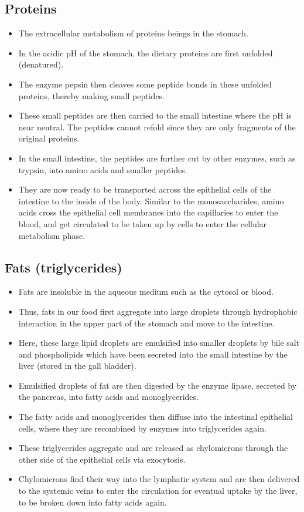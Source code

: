 \documentclass[11pt]{article}
\begin{document}
\subsection{Proteins}
\label{sec:org143371c}
\begin{itemize}
\item The extracellular metabolism of proteins beings in the stomach.
\item In the acidic pH of the stomach, the dietary proteins are first unfolded (denatured).
\item The enzyme pepsin then cleaves some peptide bonds in these unfolded proteins, thereby making small peptides.
\item These small peptides are then carried to the small intestine where the pH is near neutral. The peptides cannot refold since they are only fragments of the original proteins.
\item In the small intestine, the peptides are further cut by other enzymes, such as trypsin, into amino acids and smaller peptides.
\item They are now ready to be transported across the epithelial cells of the intestine to the inside of the body. Similar to the monosaccharides, amino acids cross the epithelial cell membranes into the capillaries to enter the blood, and get circulated to be taken up by cells to enter the cellular metabolism phase.
\end{itemize}

\newpage

\subsection{Fats (triglycerides)}
\label{sec:org0943a17}
\begin{itemize}
\item Fats are insoluble in the aqueous medium such as the cytosol or blood.
\item Thus, fats in our food first aggregate into large droplets through hydrophobic interaction in the upper part of the stomach and move to the intestine.
\item Here, these large lipid droplets are emulsified into smaller droplets by bile salt and phospholipids which have been secreted into the small intestine by the liver (stored in the gall bladder).
\item Emulsified droplets of fat are then digested by the enzyme lipase, secreted by the pancreas, into fatty acids and monoglycerides.
\item The fatty acids and monoglycerides then diffuse into the intestinal epithelial cells, where they are recombined by enzymes into triglycerides again.
\item These triglycerides aggregate and are released as chylomicrons through the other side of the epithelial cells via exocytosis.
\item Chylomicrons find their way into the lymphatic system and are then delivered to the systemic veins to enter the circulation for eventual uptake by the liver, to be broken down into fatty acids again.
\end{itemize}
\end{document}
